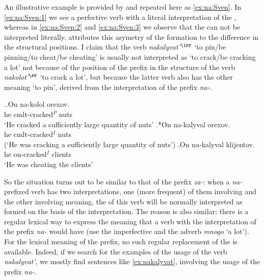 An illustrative example is provided by \citet[233]{Svenonius:04b} and repeated here as \ref{ex:na:Sven}. In \ref{ex:na:Sven:1} we see a perfective verb with a literal interpretation of the , whereas in \ref{ex:na:Sven:2} and \ref{ex:na:Sven:3} we observe that the  can not be interpreted literally. \citet[233]{Svenonius:04b} attributes this asymetry of the  formation to the difference in the structural positions. I claim that the verb \textit{nakalyvat'}$^{\IPF}$ `to pin/be pinning/to cheat/be cheating' is usually not interpreted as `to crack/be cracking a lot' not because of the position of the prefix in the structure of the verb \textit{nakolot'}$^{\PF}$ `to crack a lot', but because the latter verb also has the other meaning `to pin', derived from the  interpretation of the prefix \textit{na-}. 

\ex.\label{ex:na:Sven}\ag.\label{ex:na:Sven:1}On na-kolol orexov.\\
he cmlt-cracked$^P$ nuts\\
\trans `He cracked a sufficiently large quantity of nuts'
\bg.\label{ex:na:Sven:2}*On na-kalyval orexov.\\
he cmlt-cracked$^I$ nuts\\
\vspace{0.5em}
(`He was cracking a sufficiently large quantity of nuts')
\bg.\label{ex:na:Sven:3}On na-kalyval klijentov.\\
he on-cracked$^I$ clients\\
\trans `He was cheating the clients'\\

So the situation turns out to be similar to that of the  prefix \textit{za-}: when a \textit{na-}prefixed verb has two interpretations, one (more frequent) of them involving  and the other involving  meaning, the  of this verb will be normally interpreted as formed on the basis of the  interpretation. The reason is also similar: there is a regular lexical way to express the meaning that a  verb with the  interpretation of the prefix \textit{na-} would have (use the  imperfective and the adverb \textit{mnogo} `a lot'). For the lexical meaning of the prefix, no such regular replacement of the  is available. Indeed, if we search for the examples of the usage of the verb \textit{nakalyvat'}, we mostly find sentences like \ref{ex:nakalyvat}, involving the  usage of the prefix \textit{na-}. 

